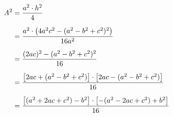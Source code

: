 \documentclass[preview]{standalone}
\begin{document}
\begin{align*}
\special{dvisvgm:raw <g id='unique000'>}A^2 &= \frac{a^2 \cdot h^2}{4} \\[6pt] \special{dvisvgm:raw </g>}\special{dvisvgm:raw <g id='unique001'>}&= \frac{a^2 \cdot \bigl(4a^2c^2 - (a^2-b^2+c^2)^2\bigr)}{16a^2} \\[6pt] \special{dvisvgm:raw </g>}\special{dvisvgm:raw <g id='unique002'>}&= \frac{(2ac)^2 - (a^2-b^2+c^2)^2}{16} \\[6pt] \special{dvisvgm:raw </g>}\special{dvisvgm:raw <g id='unique003'>}&= \frac{\bigl[2ac+(a^2-b^2+c^2)\bigr]\cdot\bigl[2ac-(a^2-b^2+c^2)\bigr]}{16} \\[6pt] \special{dvisvgm:raw </g>}\special{dvisvgm:raw <g id='unique004'>}&= \frac{\bigl[(a^2+2ac+c^2)-b^2\bigr]\cdot\bigl[-(a^2-2ac+c^2)+b^2\bigr]}{16}\special{dvisvgm:raw </g>}
\end{align*}
\end{document}
